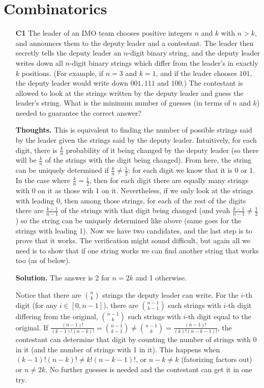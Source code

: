 \documentclass[11pt,a4paper]{article}
\begin{document}
\section{Combinatorics}
\begin{itemize}
\item[\textbf{C1}]
 The leader of an IMO team chooses positive integers $n$ and $k$ with $n > k$, and announces them to the deputy leader and a contestant. The leader then secretly tells the deputy leader an $n$-digit binary string, and the deputy leader writes down all $n$-digit binary strings which differ from the leader’s in exactly $k$ positions. (For example, if $n = 3$ and $k = 1$, and if the leader chooses $101$, the deputy leader would write down $001, 111$ and $100$.) The contestant is allowed to look at the strings written by the deputy leader and guess the leader’s string. What is the minimum number of guesses (in terms of $n$ and $k$) needed to guarantee the correct answer?

\textbf{Thoughts.} 
This is equivalent to finding the number of possible strings said by the leader given the strings said by the deputy leader. 
Intuitively, for each digit, there is $\frac kn$ probability of it being changed by the deputy leader (so there will be $\frac kn$ of the strings with the digit being changed). 
From here, the string can be uniquely determined if $\frac kn\neq \frac 12$: 
for each digit we know that it is 0 or 1.  
In the case where $\frac kn=\frac 12$, 
then for each digit there are equally many strings with 0 on it as those wih 1 on it. 
Nevertheless, if we only look at the strings with leading 0, 
then among those strings, for each of the rest of the digits there are $\frac{k-1}{n-1}$ of the strings with that digit being changed 
(and yeah $\frac{k-1}{n-1}\neq \frac 12$) 
so the string can be uniquely determined like above (same goes for the strings with leading 1). 
Now we have two candidates, and the last step is to prove that it works. 
The verification might sound difficult, but again all we need is to show that if one string works we can find another string that works too (as of below). 

\textbf{Solution.} The answer is 2 for $n=2k$ and 1 otherwise. 

Notice that there are $\binom nk$ strings the deputy leader can write. 
For the $i$-th digit (for any $i\in [0, n-1]$), there are $\binom {n-1}{k-1}$ such strings with $i$-th digit differing from the original, 
$\binom {n-1}k$ such strings with $i$-th digit equal to the original. 
If $\frac{(n-1)!}{(k-1)!(n-k)!}=\binom {n-1}{k-1}\neq \binom {n-1}k=\frac{(n-1)!}{(k)!(n-k-1)!}$, the contestant can determine that digit by counting the number of strings with 0 in it (and the number of strings with 1 in it). 
This happens when $(k-1)!(n-k)!\neq k!(n-k-1)!$, or $n-k\neq k$ (fatorizing factors out) or $n\neq 2k$. 
No further guesses is needed and the contestant can get it in one try. 


\end{itemize}
\end{document}
